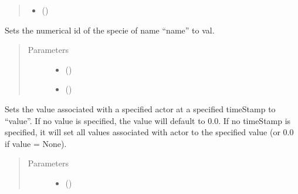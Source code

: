 \documentclass[letterpaper,10pt,openany,oneside,english]{sphinxmanual}
\begin{document}
\begin{fulllineitems}
\begin{fulllineitems}
\begin{quote}
\begin{description}
\begin{itemize}
\item {} 
\sphinxstylestrong{actor{]}} ()

\end{itemize}


\end{description}\end{quote}

\end{fulllineitems}


\begin{fulllineitems}
\label{\detokenize{support_rst/stream:stream.Stream.SetSpecieId}}
Sets the numerical id of the specie of name “name” to val.
\begin{quote}\begin{description}
\item[{Parameters}] \leavevmode\begin{itemize}
\item {} 
 () \textendash{} 

\item {} 
 () \textendash{} 

\end{itemize}

\end{description}\end{quote}

\end{fulllineitems}


\begin{fulllineitems}
\label{\detokenize{support_rst/stream:stream.Stream.SetValue}}
Sets the value associated with a specified actor at a specified
timeStamp to “value”. If no value is specified, the value will default
to 0.0. If no timeStamp is specified, it will set all values associated
with actor to the specified value (or 0.0 if value = None).
\begin{quote}\begin{description}
\item[{Parameters}] \leavevmode\begin{itemize}
\item {} 
 () \textendash{} 


\end{itemize}
\end{description}
\end{quote}
\end{fulllineitems}
\end{fulllineitems}
\end{document}
